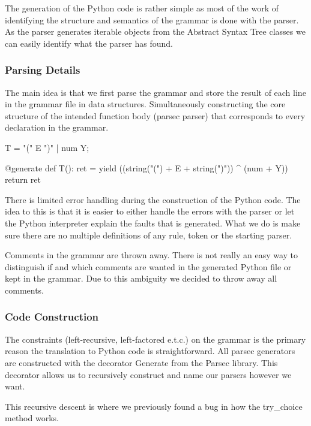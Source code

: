 The generation of the Python code is rather simple as most of the work of identifying the structure and semantics of the grammar is done with the parser. As the parser generates iterable objects from the Abstract Syntax Tree classes we can easily identify what the parser has found.


\subsubsection{Parsing Details}

The main idea is that we first parse the grammar and store the result of each line in the grammar file in data structures. Simultaneously constructing the core structure of the intended function body (parsec parser) that corresponds to every declaration in the grammar.

\renewcommand{\lstlistingname}{Grammar parse}

\begin{python}[caption={Example line from a grammar.}, label=grammar1]
T = "(" E ")" | num Y;
\end{python}

\begin{python}[caption={The constructed Python code that corresponds to \ref{grammar1}.}, label=code1]
@generate
def T():
    ret = yield ((string("(") + E + string(")")) ^ (num + Y))
    return ret
\end{python}




There is limited error handling during the construction of the Python code. The idea to this is that it is easier to either handle the errors with the parser or let the Python interpreter explain the faults that is generated. What we do is make sure there are no multiple definitions of any rule, token or the starting parser.

Comments in the grammar are thrown away. There is not really an easy way to distinguish if and which comments are wanted in the generated Python file or kept in the grammar. Due to this ambiguity we decided to throw away all comments.

\subsubsection{Code Construction}

The constraints (left-recursive, left-factored e.t.c.) on the grammar is the primary reason the translation to Python code is straightforward. All parsec generators are constructed with the decorator Generate from the Parsec library. This decorator allows us to recursively construct and name our parsers however we want.

This recursive descent is where we previously found a bug in how the try\_choice method works.

